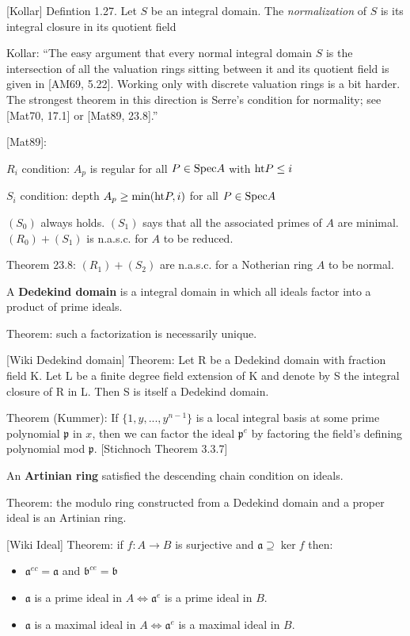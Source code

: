 [Kollar] Defintion 1.27.
Let $S$ be an integral domain.  The {\it normalization} of $S$
is its integral closure in its quotient field

Kollar: ``The easy argument that every normal integral domain $S$
is the intersection of all the valuation rings sitting between
it and its quotient field is given in [AM69, 5.22].  Working
only with discrete valuation rings is a bit harder.  The strongest
theorem in this direction is Serre's condition for normality;
see [Mat70, 17.1] or [Mat89, 23.8].''

[Mat89]:

$R_i$ condition: $A_p$ is regular for all $P \in {\rm Spec } A$ with ${\rm ht } P \le i$

$S_i$ condition: depth $A_p \ge {\rm min}({\rm ht } P, i)$ for all $P \in {\rm Spec } A$

$(S_0)$ always holds. $(S_1)$ says that all the associated primes of $A$ are minimal.
$(R_0)+(S_1)$ is n.a.s.c. for $A$ to be reduced.

Theorem 23.8: $(R_1)+(S_2)$ are n.a.s.c. for a Notherian ring $A$ to be normal.

A {\bf Dedekind domain} is a integral domain in which all ideals factor into a product of prime ideals.

Theorem: such a factorization is necessarily unique.

[Wiki Dedekind domain] Theorem: Let R be a Dedekind domain with
fraction field K. Let L be a finite degree field extension of K and
denote by S the integral closure of R in L. Then S is itself a
Dedekind domain.

Theorem (Kummer): If $\{1,y,...,y^{n-1}\}$ is a local integral basis
at some prime polynomial $\mathfrak{p}$ in $x$, then we can factor
the ideal $\mathfrak{p}^e$ by factoring the field's defining
polynomial mod $\mathfrak{p}$. [Stichnoch Theorem 3.3.7]

An {\bf Artinian ring} satisfied the descending chain condition on ideals.

Theorem: the modulo ring constructed from a Dedekind domain and a proper ideal is an Artinian ring.

[Wiki Ideal] Theorem: if $f: A \to B$ is surjective and $ \mathfrak {a}\supseteq \ker f$ then:

\begin{itemize}
\item $\mathfrak {a}^{ec}={\mathfrak {a}}$ and ${\mathfrak {b}}^{ce}={\mathfrak {b}}$
\item ${\mathfrak {a}}$ is a prime ideal in $A \Leftrightarrow {\mathfrak  {a}}^{e}$ is a prime ideal in $B$.
\item ${\mathfrak {a}}$ is a maximal ideal in $A \Leftrightarrow  {\mathfrak  {a}}^{e}$ is a maximal ideal in $B$.
\end{itemize}

